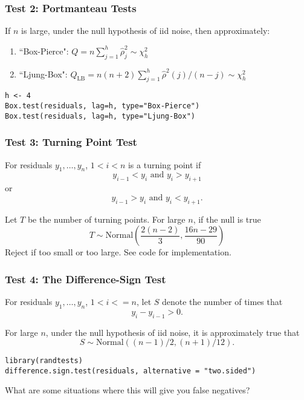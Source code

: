 \documentclass{beamer}
\begin{document}
\begin{frame}[fragile]
\frametitle{Test 2: Portmanteau Tests}

If $n$ is large, under the null hypothesis of iid noise, then approximately:
\begin{enumerate}
\item ``Box-Pierce": $Q = n\sum_{j=1}^h \hat{\rho}^2_j \sim \chi^2_{h}$
\item ``Ljung-Box": $Q_{\text{LB}} = n(n+2)\sum_{j=1}^h \hat{\rho}^2(j)/(n-j) \sim \chi^2_{h}$
\end{enumerate}

\begin{verbatim}
h <- 4
Box.test(residuals, lag=h, type="Box-Pierce") 
Box.test(residuals, lag=h, type="Ljung-Box") 
\end{verbatim}

\end{frame}


\begin{frame}
\frametitle{Test 3: Turning Point Test}

For residuals $y_1, \ldots, y_n$, $1 < i < n$ is a turning point if 
\[
y_{i-1} < y_{i} \text{ and } y_i > y_{i+1}
\]
or
\[
y_{i-1} > y_{i} \text{ and } y_i < y_{i+1}.
\]

Let $T$ be the number of turning points. For large $n$, if the null is true
\[
T \sim \text{Normal}\left(\frac{2(n-2)}{3}, \frac{16n-29}{90} \right)
\]
Reject if too small or too large. See code for implementation.

\end{frame}


\begin{frame}[fragile]
\frametitle{Test 4: The Difference-Sign Test}

For residuals $y_1, \ldots, y_n$, $1 < i <= n$, let $S$ denote the number of times that 
\[
y_i - y_{i-1} > 0.
\]

For large $n$, under the null hypothesis of iid noise, it is approximately true that
\[
S \sim \text{Normal}((n-1)/2, (n+1)/12).
\]

\begin{verbatim}
library(randtests)
difference.sign.test(residuals, alternative = "two.sided")
\end{verbatim}

What are some situations where this will give you false negatives?

\end{frame}
\end{document}
